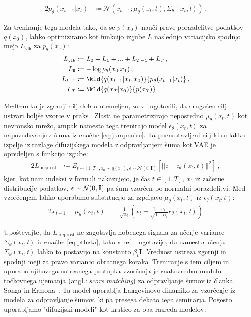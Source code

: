 \documentclass[12pt, a4paper]{article}
\begin{document}
%
\begin{alignat}{2}
p_{\theta}(x_{t-1}|x_t) &\coloneqq \mathcal{N}(x_{t-1};\mu_{\theta}(x_t, t), \Sigma_{\theta}(x_t, t))\,. \label{eq:ptheta}
\end{alignat}

Za treniranje tega modela tako, da se $p(x_0)$ nauči prave porazdelitve podatkov $q(x_0)$, lahko optimiziramo kot funkcijo izgube $L$ naslednjo variacijsko spodnjo mejo $L_{\text{vlb}}$ za $p_{\theta} (x_0)$:
%
\begin{alignat}{2}
    L_{\text{vlb}} &\coloneqq L_0 + L_1 + ... + L_{T-1} + L_T\,, \label{eq:loss} \\
    L_{0} &\coloneqq -\log p_{\theta}(x_0 | x_1)\,, \label{eq:loss0} \\
    L_{t-1} &\coloneqq \kld{q(x_{t-1}|x_t,x_0)}{p_{\theta}(x_{t-1}|x_t)}\,, \label{eq:losst} \\
    L_{T} &\coloneqq \kld{q(x_T | x_0)}{p(x_T)}\,. \label{eq:lossT}
\end{alignat}
%


%
Medtem ko je zgornji cilj dobro utemeljen, so v~\cite{DDPM} ugotovili, da drugačen cilj ustvari boljše vzorce v praksi. Zlasti ne parametrizirajo neposredno $\mu_{\theta}(x_t,t)$ kot nevronsko mrežo, ampak namesto tega trenirajo model $\epsilon_{\theta}(x_t,t)$ za napovedovanje $\epsilon$ šuma iz enačbe \ref{eq:jumpnoise}. Ta poenostavljeni cilj ki se lahko izpelje iz razlage difuzijskega modela z odpravljanjem šuma kot VAE je opredeljen s funkcijo izgube:
%
\begin{alignat}{2}
    L_{\text{preprost}} &\coloneqq E_{t \sim [1,T],x_0 \sim q(x_0), \epsilon \sim \mathcal{N}(0, \mathbf{I})}\left[\left||\epsilon - \epsilon_{\theta}(x_t, t)|\right|^2\right]\,, \label{eq:lsimple}
\end{alignat}
kjer, kot nam indeksi v formuli nakazujejo, je čas $t\in[1, T]$, $x_0$ iz  začetne distribucije podatkov, $\epsilon\sim\mathcal{N}(0, \bf{I})$ pa šum vzorčen po normalni porazdelitvi. Med vzorčenjem lahko uporabimo substitucijo za izpeljavo $\mu_{\theta}(x_t,t)$ iz $\epsilon_{\theta}(x_t,t)$:
%
\begin{alignat}{2}
    x_{t-1} =\mu_{\theta}(x_t,t) &=  \frac{1}{\sqrt{\alpha_t}}\left(x_t-\frac{1-\alpha_t}{\sqrt{1-\bar{\alpha}_t}}\epsilon_{\theta}(x_t, t)\right) \label{eq:mufromeps}
\end{alignat}

Upoštevajte, da $L_{\text{preprost}}$ ne zagotavlja nobenega signala za učenje variance $\Sigma_{\theta}(x_t,t)$ iz enačbe \ref{eq:ptheta}, tako v ref.~\cite{DDPM} ugotovijo, da namesto učenja $\Sigma_{\theta}(x_t,t)$ lahko to postavijo na konstanto $\beta_t \mathbf{I}$. Vrednost ustreza zgornji in spodnji meji za pravo varianco obratnega koraka.
Treniranje s tem ciljem in uporaba njihovega ustreznega postopka vzorčenja je enakovredno modelu točkovnega ujemanja (angl.: \textit{score matching}) za odpravljanje šumov iz članka Songa in Ermona~\cite{DDIM, improved-DDIM}. Ta model uporablja Langevinovo dinamiko za vzorčenje iz modela za odpravljanje šumov, ki pa presega debato tega seminarja. Pogosto uporabljamo "difuzijski modeli" kot kratico za oba razreda modelov. \\
\end{document}
